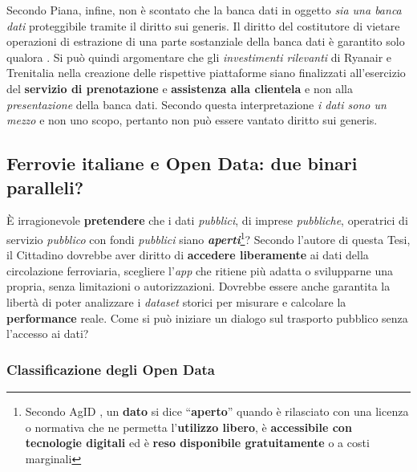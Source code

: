\documentclass[12pt,a4paper,italian]{report}
\begin{document}
Secondo Piana, infine, non è scontato che la banca dati in oggetto
\textit{sia una banca dati} proteggibile tramite il diritto sui
generis.  Il diritto del costitutore di vietare operazioni di
estrazione di una parte sostanziale della banca dati è garantito solo
qualora .  Si può quindi argomentare che gli
\textit{investimenti rilevanti} di Ryanair e Trenitalia nella
creazione delle rispettive piattaforme siano finalizzati all'esercizio
del \textbf{servizio di prenotazione} e \textbf{assistenza alla
    clientela} e non alla \textit{presentazione} della banca dati.
Secondo questa interpretazione \textit{i dati sono un mezzo} e non uno
scopo, pertanto non può essere vantato diritto sui generis.

\subsection{Ferrovie italiane e Open Data: due binari paralleli?}

È irragionevole \textbf{pretendere} che i dati \textit{pubblici}, di
imprese \textit{pubbliche}, operatrici di servizio \textit{pubblico}
con fondi \textit{pubblici} siano
\textbf{\textit{aperti}}\footnote{Secondo AgID \cite{AgidOpenData}, un
    \textbf{dato} si dice ``\textbf{aperto}'' quando è rilasciato con
    una licenza o normativa che ne permetta l'\textbf{utilizzo
        libero}, è \textbf{accessibile con tecnologie digitali} ed è
    \textbf{reso disponibile gratuitamente} o a costi marginali}?
Secondo l'autore di questa Tesi, il Cittadino dovrebbe aver diritto di
\textbf{accedere liberamente} ai dati della circolazione ferroviaria,
scegliere l'\textit{app} che ritiene più adatta o svilupparne una
propria, senza limitazioni o autorizzazioni.  Dovrebbe essere anche
garantita la libertà di poter analizzare i \textit{dataset} storici
per misurare e calcolare la \textbf{performance} reale.  Come si può
iniziare un dialogo sul trasporto pubblico senza l'accesso ai dati?

\subsubsection{Classificazione degli Open Data}
\end{document}
